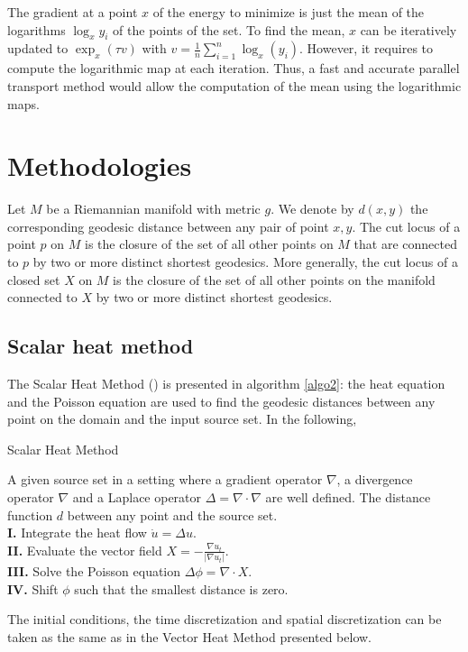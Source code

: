 \documentclass[sigconf]{acmart}
\begin{document}
The gradient at a point $x$ of the energy to minimize is just the mean of the logarithms $\log_x y_i$ of the points of the set. To find the mean, $x$ can be iteratively updated to $\exp_{x}(\tau v)$ with $v=\frac{1}{n}\sum_{i=1}^{n}\log_x(y_i)$. However, it requires to compute the logarithmic map at each iteration. Thus, a fast and accurate parallel transport method would allow the computation of the mean using the logarithmic maps.


\section{Methodologies}
Let $M$ be a Riemannian manifold with metric $g$. We denote by $d(x,y)$ the corresponding geodesic distance between any pair of point $x,y$. 
The cut locus of a point $p$ on $M$ is the closure of the set of all other points on $M$ that are connected to $p$
by two or more distinct shortest geodesics. More generally, the cut locus of a closed set $X$ on $M$ is the closure of the set of 
all other points on the manifold connected to $X$ by two or more distinct shortest geodesics.

\subsection{Scalar heat method}
The Scalar Heat Method (\cite{Crane:2017:HMD}) is presented in algorithm \ref{algo2}: the heat equation and the Poisson equation are used to find the geodesic distances
between any point on the domain and the input source set. In the following, 

\begin{algorithm}
  \caption{Scalar Heat Method} \label{algo2}
  \begin{algorithmic}
    \Require A given source set in a setting where a gradient operator $\nabla$, a divergence operator $\nabla$ and a Laplace operator $\Delta = \nabla \cdot \nabla$ 
    are well defined. 
    \Ensure The distance function $d$ between any point and the source set. \\
    \noindent \textbf{I.} Integrate the heat flow $\dot{u} = \Delta u.$\\
    \textbf{II. }Evaluate the vector field $X = -\frac{\nabla u_t}{|\nabla u_t|}.$ \\
    \textbf{III. }Solve the Poisson equation $\Delta \phi = \nabla \cdot X. $\\
    \textbf{IV. } Shift $\phi$ such that the smallest distance is zero. \\
  \end{algorithmic}
\end{algorithm}
The initial conditions, the time discretization and spatial discretization can be taken as the same as in the Vector Heat Method presented below. 
\end{document}
